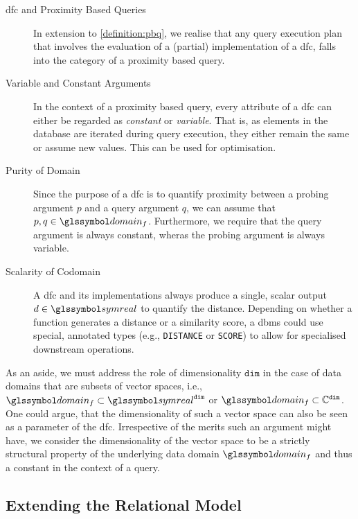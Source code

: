 \begin{description}
    \item[\acrshort{dfc} and Proximity Based Queries] In extension to \cref{definition:pbq}, we realise that any query execution plan that involves the evaluation of a (partial) implementation of a \acrshort{dfc}, falls into the category of a proximity based query.

    \item[Variable and Constant Arguments] In the context of a proximity based query, every attribute of a \acrshort{dfc} can either be regarded as \emph{constant} or \emph{variable}. That is, as elements in the database are iterated during query execution, they either remain the same or assume new values. This can be used for optimisation.
    
    \item[Purity of Domain] Since the purpose of a \acrshort{dfc} is to quantify proximity between a probing argument $p$ and a query argument $q$, we can assume that $p, q \in \domain_f$. Furthermore, we require that the query argument is always constant, wheras the probing argument is always variable.

    \item[Scalarity of Codomain] A \acrshort{dfc} and its implementations always produce a single, scalar output $d \in \symreal$ to quantify the distance. Depending on whether a function generates a distance or a similarity score, a \acrshort{dbms} could use special, annotated types (e.g., \texttt{DISTANCE} or \texttt{SCORE}) to allow for specialised downstream operations.
\end{description}

As an aside, we must address the role of dimensionality $\mathtt{dim}$ in the case of data domains that are subsets of vector spaces, i.e.,  $\domain_f \subset \symreal^{\mathtt{dim}}$ or $\domain_f \subset \mathbb{C}^{\mathtt{dim}}$. One could argue, that the dimensionality of such a vector space can also be seen as a parameter of the \acrshort{dfc}. Irrespective of the merits such an argument might have, we consider the dimensionality of the vector space to be a strictly structural property of the underlying data domain $\domain_f$ and thus a constant in the context of a query.

\subsection{Extending the Relational Model}

